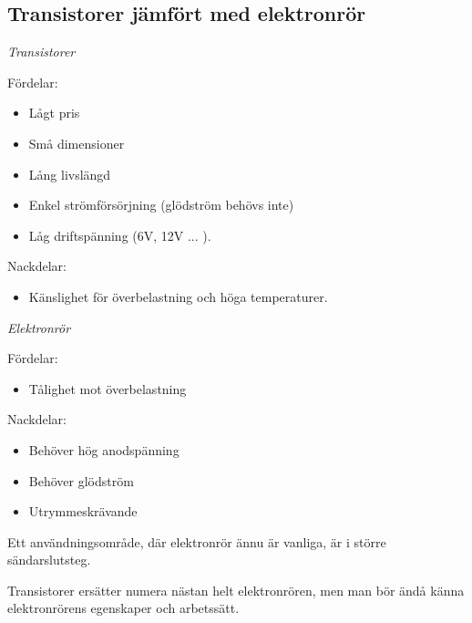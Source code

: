 \subsection{Transistorer jämfört med elektronrör}

\emph{Transistorer}

Fördelar:
\begin{itemize}
\item Lågt pris
\item Små dimensioner
\item Lång livslängd
\item Enkel strömförsörjning (glödström behövs inte)
\item Låg driftspänning (6V, 12V ... ).
\end{itemize}

Nackdelar:
\begin{itemize}
\item Känslighet för överbelastning och höga temperaturer.
\end{itemize}

\emph{Elektronrör}

Fördelar:
\begin{itemize}
\item Tålighet mot överbelastning
\end{itemize}

Nackdelar:
\begin{itemize}
\item Behöver hög anodspänning
\item Behöver glödström
\item Utrymmeskrävande
\end{itemize}

Ett användningsområde, där elektronrör ännu är vanliga, är i större
sändarslutsteg.

Transistorer ersätter numera nästan helt elektronrören, men man bör ändå känna
elektronrörens egenskaper och arbetssätt.
